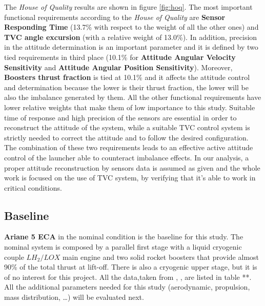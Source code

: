 \documentclass[12pt,fleqn,openany]{book} %
\begin{document}
\noindent The \textit{House of Quality} results are shown in figure \hypertarget{fig:hoq}{\ref{fig:hoq}}. The most important functional requirements according to the \textit{House of Quality} are \textbf{Sensor Responding Time} (13.7\% with respect to the weight of all the other ones) and \textbf{TVC angle excursion} (with a relative weight of 13.0\%). In addition, precision in the attitude determination is an important parameter and it is defined by two tied requirements in third place (10.1\% for \textbf{Attitude Angular Velocity Sensitivity} and \textbf{Attitude Angular Position Sensitivity}). Moreover, \textbf{Boosters thrust fraction} is tied at 10.1\% and it affects the attitude control and determination because the lower is their thrust fraction, the lower will be also the imbalance generated by them. All the other functional requirements have lower relative weights that make them of low importance to this study. Suitable time of response and high precision of the sensors are essential in order to reconstruct the attitude of the system, while a suitable TVC control system is strictly needed to correct the attitude and to follow the desired configuration. The combination of these two requirements leads to an effective active attitude control of the launcher able to counteract imbalance effects. In our analysis, a proper attitude reconstruction by sensors data is assumed as given and the whole work is focused on the use of TVC system, by verifying that it's able to work in critical conditions.  
\subsection{Baseline}
\textbf{Ariane 5 ECA} in the nominal condition is the baseline for this study. The nominal system is composed by a parallel first stage with a liquid cryogenic couple $LH_2/LOX$ main engine and two solid rocket boosters that provide almost 90\% of the total thrust at lift-off. There is also a cryogenic upper stage, but it is of no interest for this project. All the data,taken from \cite{bib:4}, \cite{bib:5}, \cite{bib:6} are listed in table **. All the additional parameters needed for this study (aerodynamic, propulsion, mass distribution, …) will be evaluated next.
\end{document}
